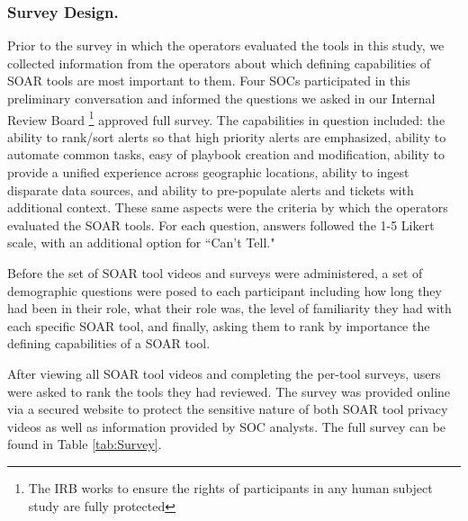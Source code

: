\subsubsection{Survey Design.}
\label{sec:survey-design}
Prior to the survey in which the operators evaluated the tools in this study, we collected information from the operators about which defining capabilities of SOAR tools are most important to them. 
Four SOCs participated in this preliminary conversation and informed the questions we asked in our Internal Review Board \footnote{The IRB works to ensure the rights of participants in any human subject study are fully protected} approved full survey.
The capabilities in question included: the ability to rank/sort alerts so that high priority alerts are emphasized, ability to automate common tasks, easy of playbook creation and modification, ability to provide a unified experience across geographic locations, ability to ingest disparate data sources, and ability to pre-populate alerts and tickets with additional context. 
These same aspects were the criteria by which the operators evaluated the SOAR tools. For each question, answers followed the 1-5 Likert scale, with an additional option for ``Can't Tell." 

Before the set of SOAR tool videos and surveys were administered, a set of demographic questions were posed to each participant including how long they had been in their role, what their role was, the level of familiarity they had with each specific SOAR tool, and finally, asking them to rank by importance the defining capabilities of a SOAR tool. 

After viewing all SOAR tool videos and completing the per-tool surveys, users were asked to rank the tools they had reviewed. The survey was provided online via a secured website to protect the sensitive nature of both SOAR tool privacy videos as well as information provided by SOC analysts. 
The full survey can be found in Table \ref{tab:Survey}. 

